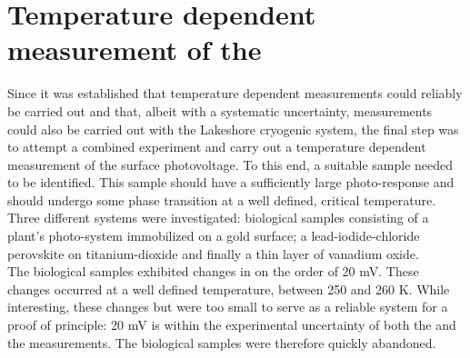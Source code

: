 \section{Temperature dependent measurement of the \spv{}}
Since it was established that temperature dependent \cpd{} measurements could reliably be carried out and that, albeit with a systematic uncertainty, \spv{} measurements could also be carried out with the Lakeshore cryogenic system, the final step was to attempt a combined experiment and carry out a temperature dependent measurement of the surface photovoltage. To this end, a suitable sample needed to be identified. This sample should have a sufficiently large photo-response and should undergo some phase transition at a well defined, critical temperature. Three different systems were investigated: biological samples consisting of a plant's photo-system immobilized on a gold surface; a lead-iodide-chloride perovskite on titanium-dioxide and finally a thin layer of vanadium oxide.\\
The biological samples exhibited changes in \cpd{} on the order of 20 mV. These changes occurred at a well defined temperature, between 250 and 260 K. While interesting, these changes but were too small to serve as a reliable system for a proof of principle: 20 mV is within the experimental uncertainty of both the \cpd{} and the \spv{} measurements. The biological samples were therefore quickly abandoned.\\
